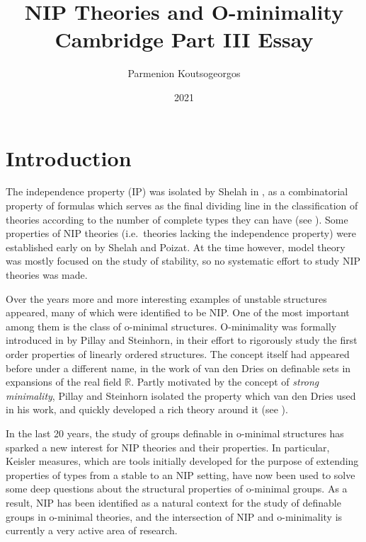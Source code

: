 \documentclass[a4paper]{report}
\newcommand{\ind}{\hspace{15pt}}
\newcommand{\R}{\mathbb{R}}
\theoremstyle{definition}
\theoremstyle{remstyle}
\newcommand{\uchapter}[1]{%
	\chapter*{#1}%
	\markboth{#1}{}%
	\addcontentsline{toc}{chapter}{#1}%
}
\begin{document}
\title{NIP Theories and O-minimality \\ \vspace{+8pt} \large Cambridge Part III Essay}
\author{Parmenion Koutsogeorgos}
\date{2021}

\maketitle

\vspace{+16pt}

\tableofcontents

\newpage


\uchapter{Introduction}

\ind The independence property (IP) was isolated by Shelah in \cite{nip og}, as a combinatorial property of formulas which serves as the final dividing line in the classification of theories according to the number of complete types they can have (see \cite{stability function, six classes}). Some properties of NIP theories (i.e.\ theories lacking the independence property) were established early on by Shelah and Poizat. At the time however, model theory was mostly focused on the study of stability, so no systematic effort to study NIP theories was made.

\ind Over the years more and more interesting examples of unstable structures appeared, many of which were identified to be NIP. One of the most important among them is the class of o-minimal structures. O-minimality was formally introduced in \cite{defI} by Pillay and Steinhorn, in their effort to rigorously study the first order properties of linearly ordered structures. The concept itself had appeared before under a different name, in the work of van den Dries on definable sets in expansions of the real field $\R$. Partly motivated by the concept of \emph{strong minimality}, Pillay and Steinhorn isolated the property which van den Dries used in his work, and quickly developed a rich theory around it (see \cite{defI,defII,discrete,defIII}).

\ind In the last 20 years, the study of groups definable in o-minimal structures has sparked a new interest for NIP theories and their properties. In particular, Keisler measures, which are tools initially developed for the purpose of extending properties of types from a stable to an NIP setting, have now been used to solve some deep questions about the structural properties of o-minimal groups. As a result, NIP has been identified as a natural context for the study of definable groups in o-minimal theories, and the intersection of NIP and o-minimality is currently a very active area of research.
\end{document}
